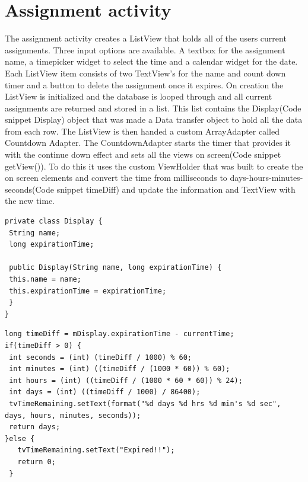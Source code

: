 \clearpage
\section{Assignment activity}
The assignment activity creates a ListView that holds all of the users current assignments. Three input options are available. A textbox for the assignment name, a timepicker widget to select the time and a calendar widget for the date. Each ListView item consists of two TextView's for the name and count down timer and a button to delete the assignment once it expires. On creation the ListView is initialized and the database is looped through and all current assignments are returned and stored in a list. This list contains the Display(Code snippet Display) object that was made a Data transfer object to hold all the data from each row. The ListView is then handed a custom ArrayAdapter called Countdown Adapter. The CountdownAdapter starts the timer that provides it with the continue down effect and sets all the views on screen(Code snippet getView()). To do this it uses the custom ViewHolder that was built to create the on screen elements and convert the time from milliseconds to days-hours-minutes-seconds(Code snippet timeDiff) and update the information and TextView with the new time.

\begin{verbatim}
private class Display {
 String name;
 long expirationTime;

 public Display(String name, long expirationTime) {
 this.name = name;
 this.expirationTime = expirationTime;
 }
}
\end{verbatim}

\begin{verbatim}
long timeDiff = mDisplay.expirationTime - currentTime;
if(timeDiff > 0) {
 int seconds = (int) (timeDiff / 1000) % 60;
 int minutes = (int) ((timeDiff / (1000 * 60)) % 60);
 int hours = (int) ((timeDiff / (1000 * 60 * 60)) % 24);
 int days = (int) ((timeDiff / 1000) / 86400);
 tvTimeRemaining.setText(format("%d days %d hrs %d min's %d sec", days, hours, minutes, seconds));
 return days;
}else {
   tvTimeRemaining.setText("Expired!!");
   return 0;
 }
\end{verbatim}

